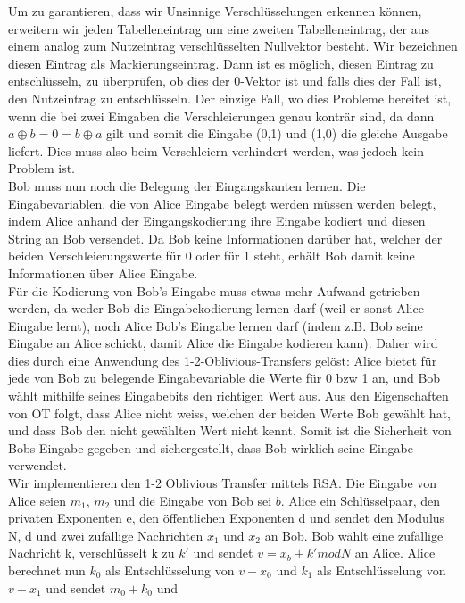 \documentclass{article}
\begin{document}
Um zu garantieren, dass wir Unsinnige Verschl\"usselungen erkennen k\"onnen,
erweitern wir jeden Tabelleneintrag um eine zweiten Tabelleneintrag, der 
aus einem analog zum Nutzeintrag verschl\"usselten Nullvektor besteht.
Wir bezeichnen diesen Eintrag als
Markierungseintrag. Dann ist es m\"oglich, diesen Eintrag
zu entschl\"usseln, zu \"uberpr\"ufen, ob dies der 0-Vektor ist und falls dies
der Fall ist, den Nutzeintrag zu entschl\"usseln. Der einzige Fall, wo dies
Probleme bereitet ist, wenn die bei zwei Eingaben die Verschleierungen 
genau kontr\"ar sind, da dann \(a \oplus b = 0 = b \oplus a\) gilt
und somit die Eingabe (0,1) und (1,0) die gleiche Ausgabe liefert. Dies
muss also beim Verschleiern verhindert werden, was jedoch kein Problem ist.\\
Bob muss nun noch die Belegung der Eingangskanten lernen. Die
Eingabevariablen, die von Alice Eingabe belegt werden m\"ussen werden
belegt, indem Alice anhand der Eingangskodierung ihre Eingabe kodiert
und diesen String an Bob versendet. Da Bob keine Informationen dar\"uber
hat, welcher der beiden Verschleierungswerte f\"ur 0 oder f\"ur 1 steht,
erh\"alt Bob damit keine Informationen \"uber Alice Eingabe.\\
F\"ur die Kodierung von Bob's Eingabe muss etwas mehr Aufwand getrieben
werden, da weder Bob die Eingabekodierung lernen darf (weil er sonst
Alice Eingabe lernt), noch Alice Bob's Eingabe lernen darf (indem z.B.
Bob seine Eingabe an Alice schickt, damit Alice die Eingabe kodieren kann).
Daher wird dies durch eine Anwendung des 1-2-Oblivious-Transfers gel\"ost:
Alice bietet f\"ur jede von Bob zu belegende Eingabevariable die Werte
f\"ur 0 bzw 1 an, und Bob w\"ahlt mithilfe seines Eingabebits den richtigen
Wert aus. Aus den Eigenschaften von OT folgt, dass Alice nicht weiss, welchen
der beiden Werte Bob gew\"ahlt hat, und dass Bob den nicht gew\"ahlten Wert
nicht kennt. Somit ist die Sicherheit von Bobs Eingabe gegeben und 
sichergestellt, dass Bob wirklich seine Eingabe verwendet.\\
Wir implementieren den 1-2 Oblivious Transfer mittels RSA. Die Eingabe
von Alice seien \(m_1\), \(m_2\) und die Eingabe von Bob sei \(b\).
Alice ein Schl\"usselpaar, den privaten Exponenten e, den
\"offentlichen Exponenten d und sendet den Modulus N, d und zwei zuf\"allige
Nachrichten \(x_1\) und \(x_2\) an Bob. Bob w\"ahlt eine zuf\"allige Nachricht
k, verschl\"usselt k zu \(k'\) und sendet \(v = x_b + k' mod N\) an Alice. 
Alice berechnet nun \(k_0\) als Entschl\"usselung von \(v - x_0\) und 
\(k_1\) als Entschl\"usselung von \(v - x_1\) und sendet \(m_0 + k_0\) und
\end{document}
